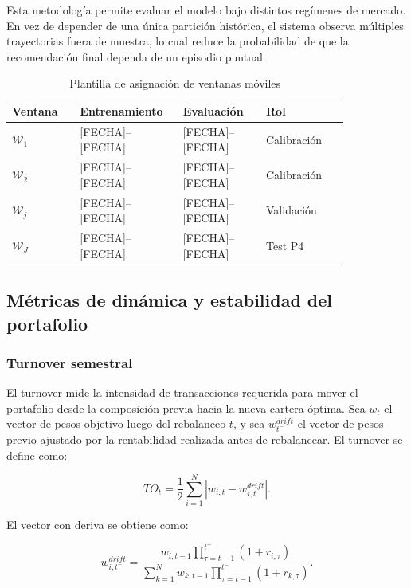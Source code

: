 \documentclass[11pt]{article}
\begin{document}
Esta metodolog\'ia permite evaluar el modelo bajo distintos reg\'imenes de mercado. En vez de depender de una \'unica partici\'on hist\'orica, el sistema observa m\'ultiples trayectorias fuera de muestra, lo cual reduce la probabilidad de que la recomendaci\'on final dependa de un episodio puntual.

\begin{table}[H]
\centering
\caption{Plantilla de asignaci\'on de ventanas m\'oviles}
\begin{tabular}{p{0.18\linewidth} p{0.22\linewidth} p{0.22\linewidth} p{0.22\linewidth}}
\toprule
Ventana & Entrenamiento & Evaluaci\'on & Rol \\
\midrule
$\mathcal{W}_1$ & [FECHA]--[FECHA] & [FECHA]--[FECHA] & Calibraci\'on \\
$\mathcal{W}_2$ & [FECHA]--[FECHA] & [FECHA]--[FECHA] & Calibraci\'on \\
$\mathcal{W}_j$ & [FECHA]--[FECHA] & [FECHA]--[FECHA] & Validaci\'on \\
$\mathcal{W}_J$ & [FECHA]--[FECHA] & [FECHA]--[FECHA] & Test P4 \\
\bottomrule
\end{tabular}
\end{table}

\subsection{M\'etricas de din\'amica y estabilidad del portafolio}

\subsubsection{Turnover semestral}

El turnover mide la intensidad de transacciones requerida para mover el portafolio desde la composici\'on previa hacia la nueva cartera \'optima. Sea $w_t$ el vector de pesos objetivo luego del rebalanceo $t$, y sea $w_{t^-}^{drift}$ el vector de pesos previo ajustado por la rentabilidad realizada antes de rebalancear. El turnover se define como:

\begin{equation}
    TO_t
    =
    \frac{1}{2}
    \sum_{i=1}^{N}
    \left|
    w_{i,t}
    -
    w_{i,t^-}^{drift}
    \right|.
\end{equation}

El vector con deriva se obtiene como:

\begin{equation}
    w_{i,t^-}^{drift}
    =
    \frac{
    w_{i,t-1}
    \prod_{\tau=t-1}^{t^-}(1+r_{i,\tau})
    }{
    \sum_{k=1}^{N}
    w_{k,t-1}
    \prod_{\tau=t-1}^{t^-}(1+r_{k,\tau})
    }.
\end{equation}
\end{document}
